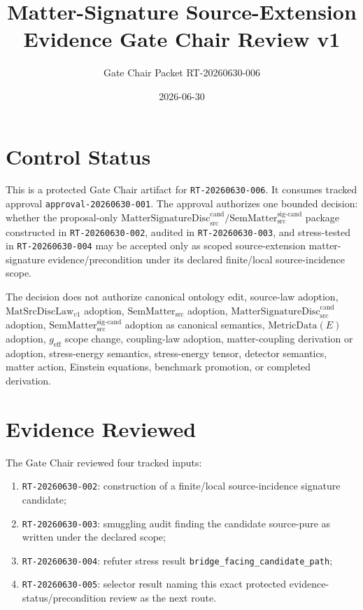 \documentclass[11pt]{article}
\title{Matter-Signature Source-Extension Evidence Gate Chair Review v1}
\author{Gate Chair Packet RT-20260630-006}
\date{2026-06-30}
\newcommand{\MetricData}{\mathrm{MetricData}}
\newcommand{\geff}{g_{\mathrm{eff}}}
\newcommand{\MatSrcDiscLaw}{\mathrm{MatSrcDiscLaw}_{v1}}
\newcommand{\SemMatterSrc}{\mathrm{SemMatter}_{\mathrm{src}}}
\newcommand{\SemMatterSig}{\mathrm{SemMatter}_{\mathrm{src}}^{\mathrm{sig\text{-}cand}}}
\newcommand{\MatSigDisc}{\mathrm{MatterSignatureDisc}_{\mathrm{src}}^{\mathrm{cand}}}
\begin{document}
\maketitle

\section{Control Status}

This is a protected Gate Chair artifact for \texttt{RT-20260630-006}. It
consumes tracked approval \texttt{approval-20260630-001}. The approval
authorizes one bounded decision: whether the proposal-only
\(\MatSigDisc / \SemMatterSig\) package constructed in
\texttt{RT-20260630-002}, audited in \texttt{RT-20260630-003}, and
stress-tested in \texttt{RT-20260630-004} may be accepted only as scoped
source-extension matter-signature evidence/precondition under its declared
finite/local source-incidence scope.

The decision does not authorize canonical ontology edit, source-law adoption,
\(\MatSrcDiscLaw\) adoption, \(\SemMatterSrc\) adoption, \(\MatSigDisc\)
adoption, \(\SemMatterSig\) adoption as canonical semantics, \(\MetricData(E)\)
adoption, \(\geff\) scope change, coupling-law adoption, matter-coupling
derivation or adoption, stress-energy semantics, stress-energy tensor,
detector semantics, matter action, Einstein equations, benchmark promotion, or
completed derivation.

\section{Evidence Reviewed}

The Gate Chair reviewed four tracked inputs:

\begin{enumerate}[label=(\alph*)]
  \item \texttt{RT-20260630-002}: construction of a finite/local
  source-incidence signature candidate;
  \item \texttt{RT-20260630-003}: smuggling audit finding the candidate
  source-pure as written under the declared scope;
  \item \texttt{RT-20260630-004}: refuter stress result
  \texttt{bridge\_facing\_candidate\_path};
  \item \texttt{RT-20260630-005}: selector result naming this exact protected
  evidence-status/precondition review as the next route.
\end{enumerate}
\end{document}
